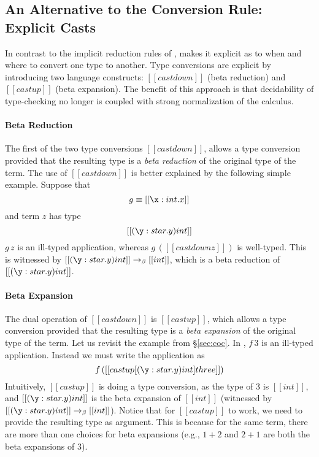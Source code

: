 \subsection{An Alternative to the Conversion Rule: Explicit Casts}

  In contrast to the implicit
reduction rules of \coc, \name makes it explicit as to when and where
to convert one type to another. Type conversions are explicit by
introducing two language constructs: $[[castdown]]$ (beta reduction)
and $[[castup]]$ (beta expansion). The benefit of this approach is
that decidability of type-checking no longer is coupled with strong
normalization of the calculus.

\paragraph{Beta Reduction} The first of the two type conversions
$[[castdown]]$, allows a type conversion provided that the resulting
type is a \emph{beta reduction} of the original type of the term. The
use of $[[castdown]]$ is better explained by the following simple
example. Suppose that
\[ g \equiv [[\x:int.x]] \]
and term $z$ has type
\[ [[(\y:star.y)int]] \]
$ g\,z $ is an ill-typed application, whereas $ g\,([[castdown z]]) $
is well-typed. This is witnessed by
$[[(\y:star.y)int]] \rightarrow_{\beta} [[int]]$, which is a beta
reduction of $[[(\y:star.y)int]]$.  

\paragraph{Beta Expansion} The dual operation of $[[castdown]]$ is
$[[castup]]$, which allows a type conversion provided that the
resulting type is a \emph{beta expansion} of the original type of the
term.  Let us revisit the example from \S\ref{sec:coc}. In \name,
$f\,3$ is an ill-typed application. Instead we must write the
application as
\[ f\,([[castup[(\y:star.y)int] three]]) \]
  Intuitively,
$[[castup]]$ is doing a type conversion, as the type of $ 3 $ is
$ [[int]] $, and $ [[(\y:star.y)int]] $ is the beta expansion of
$[[int]]$ (witnessed by
$[[(\y:star.y)int]] \rightarrow_{\beta} [[int]]$).   Notice that for
$[[castup]]$ to work, we need to provide the resulting type as
argument. This is because for the same term, there are more than one
choices for beta expansions (e.g., $1 + 2$ and $2 + 1$ are both the
beta expansions of $3$).  

